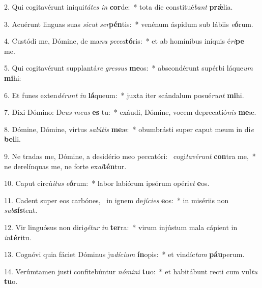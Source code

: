 2. Qui cogitavérunt iniqui\textit{tá}\textit{tes} \textit{in} \textbf{cor}de:~*  tota die constitué\textit{bant} \textbf{prǽ}lia.\

3. Acuérunt linguas suas \textit{sic}\textit{ut} \textit{ser}\textbf{pén}tis:~*  venénum áspidum sub lábiis \textit{e}\textbf{ó}rum.\

4. Custódi me, Dómine, de ma\textit{nu} \textit{pec}\textit{ca}\textbf{tó}ris:~*  et ab homínibus iníquis é\textit{ri}\textbf{pe} me.\

5. Qui cogitavérunt supplantá\textit{re} \textit{gres}\textit{sus} \textbf{me}os:~*  abscondérunt supérbi láque\textit{um} \textbf{mi}hi:\

6. Et funes exten\textit{dé}\textit{runt} \textit{in} \textbf{lá}queum:~*  juxta iter scándalum posué\textit{runt} \textbf{mi}hi.\

7. Dixi Dómino: De\textit{us} \textit{me}\textit{us} \textbf{es} tu:~*  exáudi, Dómine, vocem deprecatió\textit{nis} \textbf{me}æ.\

8. Dómine, Dómine, virtus \textit{sa}\textit{lú}\textit{tis} \textbf{me}æ:~*  obumbrásti super caput meum in di\textit{e} \textbf{bel}li.\

9. Ne tradas me, Dómine, a desidério meo peccatóri: \dag\  cogi\textit{ta}\textit{vé}\textit{runt} \textbf{con}tra me,~*  ne derelínquas me, ne forte ex\textit{al}\textbf{tén}tur.\

10. Caput circú\textit{i}\textit{tus} \textit{e}\textbf{ó}rum:~*  labor labiórum ipsórum opéri\textit{et} \textbf{e}os.\

11. Cadent super eos carbónes, \dag\  in ignem de\textit{jí}\textit{ci}\textit{es} \textbf{e}os:~*  in misériis non \textit{sub}\textbf{sís}tent.\

12. Vir linguósus non diri\textit{gé}\textit{tur} \textit{in} \textbf{ter}ra:~*  virum injústum mala cápient in \textit{in}\textbf{tér}itu.\

13. Cognóvi quia fáciet Dóminus ju\textit{dí}\textit{ci}\textit{um} \textbf{ín}opis:~*  et vindíc\textit{tam} \textbf{páu}perum.\

14. Verúmtamen justi confitebúntur \textit{nó}\textit{mi}\textit{ni} \textbf{tu}o:~*  et habitábunt recti cum vul\textit{tu} \textbf{tu}o.\

